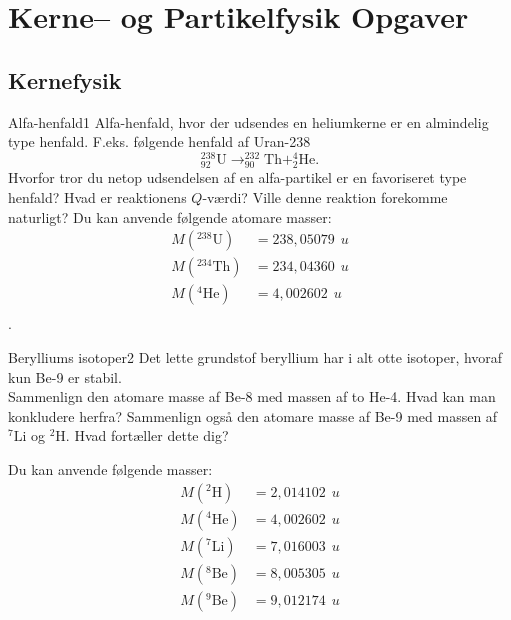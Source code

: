 

\chapter{Kerne-- og Partikelfysik Opgaver}

\section*{Kernefysik}
\begin{opgave}{Alfa-henfald}{1}
Alfa-henfald, hvor der udsendes en heliumkerne er en almindelig type henfald. F.eks. følgende henfald af Uran-238
\begin{equation*}
^{238}_{92} \text{U} \rightarrow ^{232}_{90}\text{Th} + ^{4}_{2}\text{He} .
\end{equation*}
\opg Hvorfor tror du netop udsendelsen af en alfa-partikel er en favoriseret type henfald? 
\opg Hvad er reaktionens $Q$-værdi? Ville denne reaktion forekomme naturligt?
Du kan anvende følgende atomare masser:
\begin{align*}
M(^{238}\text{U}) &=238,05079~\SI{}{u} \\
M(^{234}\text{Th}) &= 234,04360~\SI{}{u} \\
M(^4\text{He}) &= 4,002602~\SI{}{u} \\
\end{align*}
.
\end{opgave}

\begin{opgave}{Berylliums isotoper}{2}
Det lette grundstof beryllium har i alt otte isotoper, hvoraf kun Be-9 er stabil. \\
\opg Sammenlign den atomare masse af Be-8 med massen af to He-4. Hvad kan man konkludere herfra? 
\opg Sammenlign også den atomare masse af Be-9 med massen af $^7\text{Li}$ og $^2\text{H}$. Hvad fortæller dette dig?

Du kan anvende følgende masser:
\begin{align*}
M(^2\text{H}) &= 2,014102~\SI{}{u}\\
M(^4\text{He}) &= 4,002602~\SI{}{u} \\
M(^7\text{Li}) &= 7,016003~\SI{}{u} \\
M(^8\text{Be}) &= 8,005305~\SI{}{u} \\
M(^9\text{Be}) &= 9,012174~\SI{}{u}
\end{align*} 
\end{opgave}

